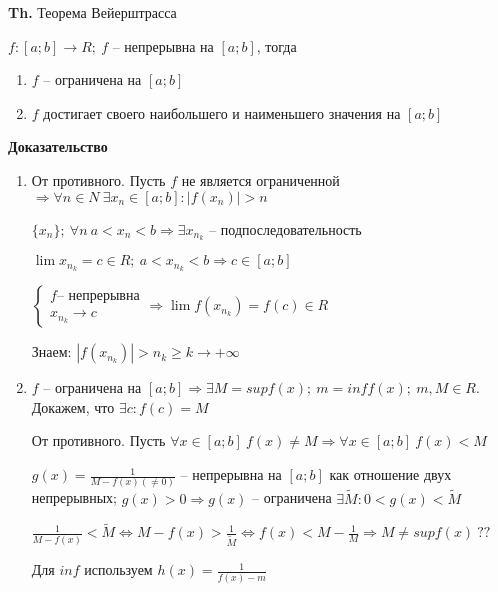 \documentclass[14pt, letter paper]{article}
\begin{document}
\textbf{Th.} Теорема Вейерштрасса

$f : [a;b] \rightarrow R;\ f$ -- непрерывна на $[a; b]$, тогда 

\begin{enumerate}
    \item $f$ -- ограничена на $[a; b]$
    \item $f$ достигает своего наибольшего и наименьшего значения на $[a; b]$
\end{enumerate}

\begin{center}
    \textbf{Доказательство}
\end{center}

\begin{enumerate}
    \item От противного. Пусть $f$ не является ограниченной $\Rightarrow \forall n \in N\ \exists x_n \in [a;b] : |f(x_n)| > n$

    $\{x_n\};\ \forall n\ a < x_n < b \Rightarrow \exists x_{n_k}$ -- подпоследовательность 

    $\lim{x_{n_k}} = c \in R;\ a < x_{n_k} < b \Rightarrow c \in [a;b]$

    $\begin{cases}
        f \text{-- непрерывна} \\
        x_{n_k} \rightarrow c
    \end{cases} \Rightarrow \lim{f(x_{n_k})} = f(c) \in R$

    Знаем: $|f(x_{n_k})| > n_k \geq k \rightarrow + \infty$

    \item $f$ -- ограничена на $[a;b] \Rightarrow \exists M = supf(x);\ m = inff(x);\ m, M \in R$. Докажем, что $\exists c : f(c) = M$

    От противного. Пусть $\forall x \in [a;b]\ f(x) \neq M \Rightarrow \forall x \in [a;b]\ f(x) < M$

    $g(x) = \frac{1}{M - f(x) (\neq 0)}$ -- непрерывна на $[a;b]$ как отношение двух непрерывных; $g(x) > 0 \Rightarrow g(x)$ -- ограничена $\exists \tilde{M} : 0 < g(x) < \tilde{M}$

    $\frac{1}{M - f(x)} < \tilde{M} \Leftrightarrow M-f(x) > \frac{1}{\tilde{M}} \Leftrightarrow f(x) < M - \frac{1}{M} \Rightarrow M \neq supf(x)\ ??$

    Для $inf$ используем $h(x) = \frac{1}{f(x) - m}$
\end{enumerate}

\vspace{5mm}
\end{document}
